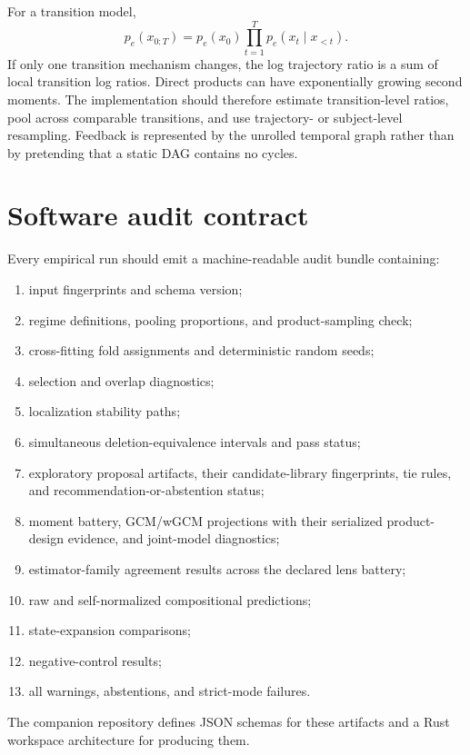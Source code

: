\documentclass[11pt]{article}
\begin{document}
For a transition model,
\begin{equation}
p_e(x_{0:T})=p_e(x_0)\prod_{t=1}^Tp_e(x_t\mid x_{<t}).
\end{equation}
If only one transition mechanism changes, the log trajectory ratio is a sum of local transition log ratios.  Direct products can have exponentially growing second moments.  The implementation should therefore estimate transition-level ratios, pool across comparable transitions, and use trajectory- or subject-level resampling.  Feedback is represented by the unrolled temporal graph rather than by pretending that a static DAG contains no cycles.

\section{Software audit contract}

Every empirical run should emit a machine-readable audit bundle containing:
\begin{enumerate}
\item input fingerprints and schema version;
\item regime definitions, pooling proportions, and product-sampling check;
\item cross-fitting fold assignments and deterministic random seeds;
\item selection and overlap diagnostics;
\item localization stability paths;
\item simultaneous deletion-equivalence intervals and pass status;
\item exploratory proposal artifacts, their candidate-library fingerprints, tie rules, and recommendation-or-abstention status;
\item moment battery, GCM/wGCM projections with their serialized product-design evidence, and joint-model diagnostics;
\item estimator-family agreement results across the declared lens battery;
\item raw and self-normalized compositional predictions;
\item state-expansion comparisons;
\item negative-control results;
\item all warnings, abstentions, and strict-mode failures.
\end{enumerate}
The companion repository defines JSON schemas for these artifacts and a Rust workspace architecture for producing them.
\end{document}
